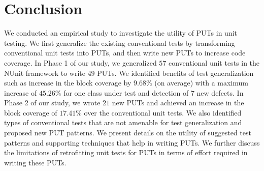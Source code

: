 \section{Conclusion}
\label{sec:conclusion}
\vspace*{2ex}
We conducted an empirical study to investigate the utility of PUTs in unit testing. We first generalize the existing conventional tests by transforming conventional
unit tests into PUTs, and then write new PUTs to increase code coverage. In Phase 1 of our study, we generalized $57$ conventional unit tests in the NUnit framework to write $49$ PUTs. We identified benefits of test generalization such as increase in the block coverage by $9.68$\% (on average) with a maximum increase of $45.26\%$ for one class under test and detection of $7$ new defects. In Phase 2 of our study, we wrote $21$ new PUTs and achieved an increase in the block coverage of $17.41$\% over the conventional unit tests. We also identified types of conventional tests that are not amenable for test generalization and proposed new PUT patterns. We present details on the utility of suggested test patterns and supporting techniques that help in writing PUTs. We further discuss the limitations of retrofitting unit tests for PUTs in terms of effort required in writing these PUTs. 